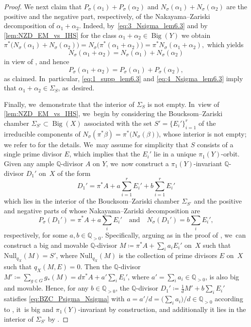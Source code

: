 \documentclass[10pt]{amsart}
\theoremstyle{plain}
\theoremstyle{definition}
\newcommand{\Q}{\mathbb{Q}}
\DeclareMathOperator{\BgCn}{\mathrm{Big}}
\begin{document}
\begin{proof}
We next claim that $P_\sigma(\alpha_1) + P_\sigma(\alpha_2)$ and $ N_\sigma(\alpha_1) + N_\sigma(\alpha_2)$ are the positive and the negative part, respectively, of the Nakayama--Zariski decomposition of $\alpha_1 + \alpha_2$. Indeed, by~\eqref{eq:3_Nsigma_lem6.3} and by \autoref{lem:NZD_EM_vs_IHS} for the class $\alpha_1 + \alpha_2 \in \BgCn(Y)$ we obtain
$\pi^* \bigl(N_\sigma(\alpha_1) + N_\sigma(\alpha_2) \bigr)
= N_\sigma \bigl(\pi^* (\alpha_1 + \alpha_2) \bigr)
= \pi^* N_\sigma (\alpha_1 + \alpha_2), $
which yields
\begin{equation}
\label{eq:4_Nsigma_lem6.3}
N_\sigma (\alpha_1 + \alpha_2) = N_\sigma(\alpha_1) + N_\sigma(\alpha_2)
\end{equation}
in view of \cite[Ch.\,7, Th.\,2.18]{Liu02book}, and hence
\[
P_\sigma (\alpha_1 + \alpha_2) = P_\sigma(\alpha_1) + P_\sigma(\alpha_2),
\]
as claimed. In~particular, \eqref{eq:1_supp_lem6.3} and \eqref{eq:4_Nsigma_lem6.3} imply that $\alpha_1 + \alpha_2 \in \Sigma_S$, as~desired.

Finally, we~demonstrate that the interior of $\Sigma_S$ is not empty. In~view of \autoref{lem:NZD_EM_vs_IHS}, we~begin by considering the Boucksom--Zariski chamber $\Sigma_{S'} \subset \BgCn(X)$ associated with the set $S' = \{ E_i' \}_{i=1}^r$ of the irreducible components of $N_\sigma(\pi^*\beta) = \pi^* \bigl(N_{\sigma}(\beta) \bigr)$, whose interior is not empty; we refer to \cite[\S 4]{Denisi23} for the details. We~may assume for simplicity that $S$ consists of a single prime divisor $E$, which implies that the $E_i'$ lie in a unique $\pi_1(Y)$-orbit. Given any ample $\Q$\nobreakdash-divisor $A$ on $Y$, we~now construct a $\pi_1(Y)$-invariant $\Q$\nobreakdash-divisor $D_1'$ on~$X$ of the form
\begin{equation}
\label{eq:BZC_int_divisor}
D_1' = \pi^*A + a\sum_{i=1}^r E_i' + b\sum_{i=1}^r E_i'
\end{equation}
which lies in the interior of the Boucksom--Zariski chamber $\Sigma_{S'}$ and the positive and negative parts of whose Nakayama--Zariski decomposition are
\begin{equation}
\label{eq:BZC_Psigma_Nsigma}
P_\sigma(D_1') = \pi^*A + a\sum_i E_i' \quad \text{and} \quad N_\sigma(D_1') = b\sum_i E_i',
\end{equation}
respectively, for some $a, b \in \Q_{>0}$. Specifically, arguing as in the proof of \cite[Lem.\,4.15]{Denisi23}, we~can construct a big and movable $\Q$\nobreakdash-divisor $M \coloneqq \pi^*A + \sum_i a_i E_i'$ on~$X$ such that $\mathrm{Null}_{q_X}(M)=S'$, where $\mathrm{Null}_{q_X}(M)$ is the collection of prime divisors $E$ on~$X$ such that $q_X(M,E)=0$. Then the $\Q$\nobreakdash-divisor $M' \coloneqq \sum_{g\in G} g_*(M) = d \pi^*A + a' \sum_i E_i' $, where $a' = \sum_i a_i \in \Q_{>0}$, is also big and movable. Hence, for any $b \in \Q_{>0}$, the $\Q$\nobreakdash-divisor $D_1' \coloneqq \frac{1}{d}M' + b \sum_i E_i'$ satisfies \eqref{eq:BZC_Psigma_Nsigma} with $a = a' / d = \bigl(\sum_i a_i \bigr) / d \in \Q_{>0}$ according to \cite[Rem.\,4.20]{Denisi23}, it~is big and $\pi_1(Y)$-invariant by construction, and additionally it lies in the interior of $\Sigma_{S'}$ by \cite[Cor.\,4.19]{Denisi23}.


\end{proof}
\end{document}
